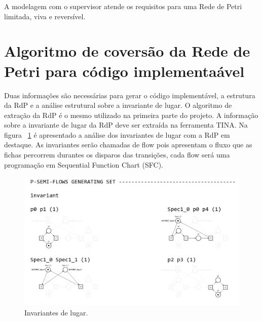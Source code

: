A modelagem com o supervisor atende os requisitos para uma Rede de Petri limitada, viva e revers\'ivel.

\section{Algoritmo de covers\~ao da Rede de Petri para c\'odigo implementa\'avel}

Duas informa\c{c}\~oes s\~ao necess\'arias para gerar o c\'odigo implement\'avel, a estrutura da RdP e a an\'alise estrutural sobre a invariante de lugar. O algoritmo de extra\c{c}\~ao da RdP \'e o mesmo utilizado na primeira parte do projeto. A informa\c{c}\~ao sobre a invariante de lugar da RdP deve ser extra\'ida na ferramenta TINA. Na figura ~\ref{fig:pqnafabstruct} \'e apresentado a an\'alise dos invariantes de lugar com a RdP em destaque. As invariantes ser\~ao chamadas de flow pois apresentam o fluxo que as fichas percorrem durantes os disparos das transi\c{c}\~oes, cada flow ser\'a uma programa\c{c}\~ao em Sequential Function Chart (SFC).

\begin{figure}[!htb]
	\caption[Invariantes de lugar.]{Invariantes de lugar.}
	\label{fig:pqnafabstruct}
	\includegraphics[width=16cm]{./figuras/PQNAFABSTRUCT.png}\centering
\end{figure}
